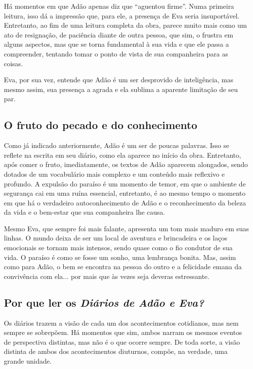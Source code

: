 \documentclass[12pt]{extarticle}
\begin{document}
Há momentos em que Adão apenas diz que ``aguentou firme''. Numa primeira
leitura, isso dá a impressão que, para ele, a presença de Eva seria
insuportável. Entretanto, ao fim de uma leitura completa da obra, parece
muito mais como um ato de resignação, de paciência diante de outra
pessoa, que sim, o frustra em alguns aspectos, mas que se torna
fundamental à sua vida e que ele passa a compreender, tentando tomar o
ponto de vista de sua companheira para as coisas.

Eva, por sua vez, entende que Adão é um ser desprovido de inteligência,
mas mesmo assim, sua presença a agrada e ela sublima a aparente
limitação de seu par.


\subsection{O fruto do pecado e do conhecimento}

Como já indicado anteriormente, Adão é um ser de poucas palavras. Isso
se reflete na escrita em seu diário, como ela aparece no início da obra.
Entretanto, após comer o fruto, imediatamente, os textos de Adão
aparecem alongados, sendo dotados de um vocabulário mais complexo e um
conteúdo mais reflexivo e profundo. A expulsão do paraíso é um momento
de temor, em que o ambiente de segurança cai em uma ruína essencial,
entretanto, é ao mesmo tempo o momento em que há o verdadeiro
autoconhecimento de Adão e o reconhecimento da beleza da vida e o
bem-estar que sua companheira lhe causa.

Mesmo Eva, que sempre foi mais falante, apresenta um tom mais maduro em
suas linhas. O mundo deixa de ser um local de aventura e brincadeira e
os laços emocionais se tornam mais intensos, sendo quase como o fio
condutor de sua vida. O paraíso é como se fosse um sonho, uma lembrança
bonita. Mas, assim como para Adão, o bem se encontra na pessoa do outro
e a felicidade emana da convivência com ela... por mais que às vezes
seja deveras estressante.

\subsection{Por que ler os \textit{Diários de Adão e Eva?}}

Os diários trazem a visão de cada um dos acontecimentos cotidianos, mas
nem sempre se sobrepõem. Há momentos que sim, ambos narram os mesmos
eventos de perspectiva distintas, mas não é o que ocorre sempre. De toda
sorte, a visão distinta de ambos dos acontecimentos diuturnos, compõe,
na verdade, uma grande unidade.
\end{document}
